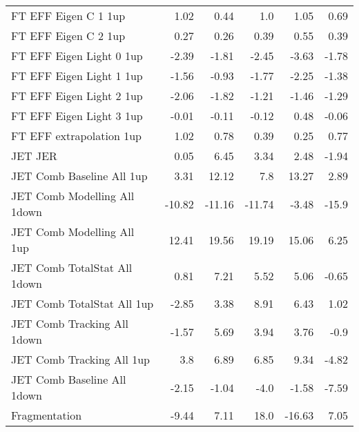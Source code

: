 \begin{table}[htbp]
{\begin{tabular}{lrrrrr}
FT EFF Eigen C 1  1up        & 1.02               & 0.44                 & 1.0                  & 1.05                 & 0.69                 \\
FT EFF Eigen C 2  1up        & 0.27               & 0.26                 & 0.39                 & 0.55                 & 0.39                 \\
FT EFF Eigen Light 0  1up    & -2.39              & -1.81                & -2.45                & -3.63                & -1.78                \\
FT EFF Eigen Light 1  1up    & -1.56              & -0.93                & -1.77                & -2.25                & -1.38                \\
FT EFF Eigen Light 2  1up    & -2.06              & -1.82                & -1.21                & -1.46                & -1.29                \\
FT EFF Eigen Light 3  1up    & -0.01              & -0.11                & -0.12                & 0.48                 & -0.06                \\
FT EFF extrapolation  1up      & 1.02               & 0.78                 & 0.39                 & 0.25                 & 0.77                 \\
JET JER                           & 0.05               & 6.45                 & 3.34                 & 2.48                 & -1.94                \\
JET Comb Baseline All  1up    & 3.31               & 12.12                & 7.8                  & 13.27                & 2.89                 \\
JET Comb Modelling All  1down & -10.82             & -11.16               & -11.74               & -3.48                & -15.9                \\
JET Comb Modelling All  1up   & 12.41              & 19.56                & 19.19                & 15.06                & 6.25                 \\
JET Comb TotalStat All  1down & 0.81               & 7.21                 & 5.52                 & 5.06                 & -0.65                \\
JET Comb TotalStat All  1up   & -2.85              & 3.38                 & 8.91                 & 6.43                 & 1.02                 \\
JET Comb Tracking All  1down  & -1.57              & 5.69                 & 3.94                 & 3.76                 & -0.9                 \\
JET Comb Tracking All  1up    & 3.8                & 6.89                 & 6.85                 & 9.34                 & -4.82                \\
JET Comb Baseline All  1down  & -2.15              & -1.04                & -4.0                 & -1.58                & -7.59                \\
Fragmentation                             & -9.44              & 7.11                 & 18.0                 & -16.63               & 7.05                 \\
\end{tabular}}
\end{table}

